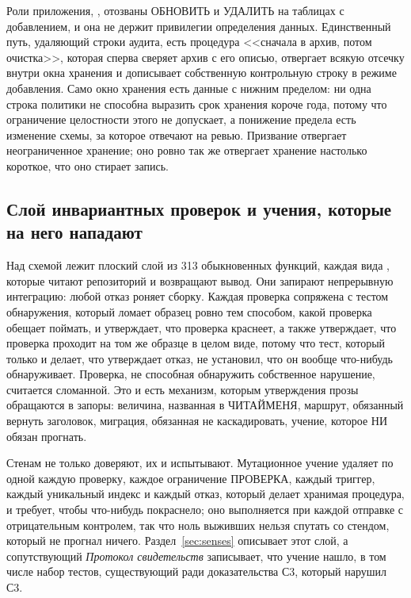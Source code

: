 Роли приложения, , отозваны ОБНОВИТЬ и УДАЛИТЬ на таблицах с добавлением, и она не
держит привилегии определения данных. Единственный путь, удаляющий строки аудита, есть процедура
<<сначала в архив, потом очистка>>, которая сперва сверяет архив с его описью, отвергает всякую
отсечку внутри окна хранения и дописывает собственную контрольную строку в режиме добавления. Само
окно хранения есть данные с нижним пределом: ни одна строка политики не способна выразить срок
хранения короче года, потому что ограничение целостности этого не допускает, а понижение предела
есть изменение схемы, за которое отвечают на ревью. Призвание отвергает неограниченное хранение;
оно ровно так же отвергает хранение настолько короткое, что оно стирает запись. \sImpl

\subsection{Слой инвариантных проверок и учения, которые на него нападают}

Над схемой лежит плоский слой из 313 обыкновенных функций, каждая вида
, которые читают репозиторий и возвращают вывод. Они запирают
непрерывную интеграцию: любой отказ роняет сборку. Каждая проверка сопряжена с тестом
обнаружения, который ломает образец ровно тем способом, какой проверка обещает поймать, и
утверждает, что проверка краснеет, а также утверждает, что проверка
проходит на том же образце в целом виде, потому что тест, который только и делает, что
утверждает отказ, не установил, что он вообще что-нибудь обнаруживает. Проверка, не способная
обнаружить собственное нарушение, считается сломанной. Это и есть механизм, которым утверждения
прозы обращаются в запоры: величина, названная в ЧИТАЙМЕНЯ, маршрут, обязанный вернуть заголовок,
миграция, обязанная не каскадировать, учение, которое НИ обязан прогнать. \sImpl

Стенам не только доверяют, их и испытывают. Мутационное учение удаляет по одной каждую проверку,
каждое ограничение ПРОВЕРКА, каждый триггер, каждый уникальный индекс и каждый отказ, который делает
хранимая процедура, и требует, чтобы что-нибудь покраснело; оно выполняется при каждой отправке с
отрицательным контролем, так что ноль выживших нельзя спутать со стендом, который не прогнал ничего.
Раздел~\ref{sec:senses} описывает этот слой, а сопутствующий \emph{Протокол свидетельств} записывает, что учение
нашло, в том числе набор тестов, существующий ради доказательства С3, который нарушил С3.
\sImpl

